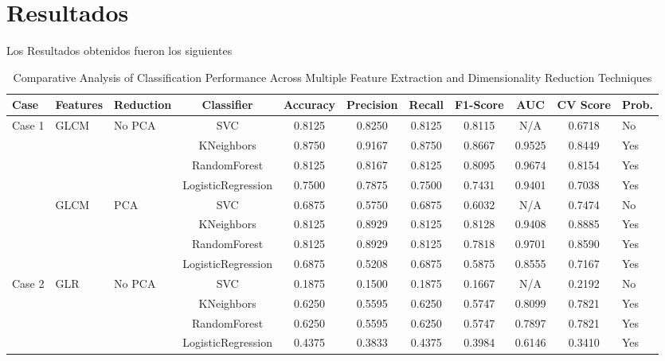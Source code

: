 \documentclass[9pt, journal]{IEEEtran}
\begin{document}
  \section{Resultados} 

  Los Resultados obtenidos fueron los siguientes



\begin{table*}[ht]
\caption{Comparative Analysis of Classification Performance Across Multiple Feature Extraction and Dimensionality Reduction Techniques}
\label{tab:comprehensive_results}
\centering
\scriptsize
\begin{adjustbox}{width=1\textwidth}
\begin{tabular}{@{}lllcccccccl@{}}
\toprule
\textbf{Case} & \textbf{Features} & \textbf{Reduction} & \textbf{Classifier} & \textbf{Accuracy} & \textbf{Precision} & \textbf{Recall} & \textbf{F1-Score} & \textbf{AUC} & \textbf{CV Score} & \textbf{Prob.} \\
\midrule
\multirow{4}{*}{Case 1} & \multirow{4}{*}{GLCM} & \multirow{4}{*}{No PCA} & SVC & 0.8125 & 0.8250 & 0.8125 & 0.8115 & N/A & 0.6718 & No \\
 &  &  & KNeighbors & 0.8750 & 0.9167 & 0.8750 & 0.8667 & 0.9525 & 0.8449 & Yes \\
 &  &  & RandomForest & 0.8125 & 0.8167 & 0.8125 & 0.8095 & 0.9674 & 0.8154 & Yes \\
 &  &  & LogisticRegression & 0.7500 & 0.7875 & 0.7500 & 0.7431 & 0.9401 & 0.7038 & Yes \\
\cmidrule(lr){2-11}
 & \multirow{4}{*}{GLCM} & \multirow{4}{*}{PCA} & SVC & 0.6875 & 0.5750 & 0.6875 & 0.6032 & N/A & 0.7474 & No \\
 &  &  & KNeighbors & 0.8125 & 0.8929 & 0.8125 & 0.8128 & 0.9408 & 0.8885 & Yes \\
 &  &  & RandomForest & 0.8125 & 0.8929 & 0.8125 & 0.7818 & 0.9701 & 0.8590 & Yes \\
 &  &  & LogisticRegression & 0.6875 & 0.5208 & 0.6875 & 0.5875 & 0.8555 & 0.7167 & Yes \\
\midrule
\multirow{4}{*}{Case 2} & \multirow{4}{*}{GLR} & \multirow{4}{*}{No PCA} & SVC & 0.1875 & 0.1500 & 0.1875 & 0.1667 & N/A & 0.2192 & No \\
 &  &  & KNeighbors & 0.6250 & 0.5595 & 0.6250 & 0.5747 & 0.8099 & 0.7821 & Yes \\
 &  &  & RandomForest & 0.6250 & 0.5595 & 0.6250 & 0.5747 & 0.7897 & 0.7821 & Yes \\
 &  &  & LogisticRegression & 0.4375 & 0.3833 & 0.4375 & 0.3984 & 0.6146 & 0.3410 & Yes \\

\end{tabular}
\end{adjustbox}
\end{table*}
\end{document}
